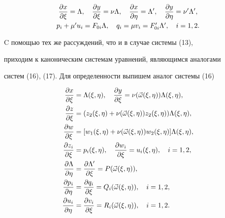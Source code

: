 \begin{equation} 


\begin{array}{c} 


\displaystyle\myfrac{x}{\xi}=\Lambda,\quad 


\myfrac{y}{\xi}=\nu\Lambda,\quad 


\myfrac{x}{\eta}=\Lambda',\quad \myfrac{y}{\eta} 


=\nu'\Lambda', \\[3mm] 


% 


p_i+\mu' u_i=F_{0i}\Lambda,\quad 


q_i=\mu v_i=F'_{0i}\Lambda',\quad i=1,2. 


\end{array} 


\end{equation} 


C помощью тех же рассуждений, что и в случае системы (13), 


приходим к каноническим системам уравнений, являющимся аналогами 


систем (16), (17). Для определенности выпишем аналог системы (16)


\begin{align} 


\myfrac{x}{\xi}&=\Lambda(\xi,\eta),\quad 


\myfrac{y}{\xi}=\nu(\Vec\omega(\xi,\eta))\Lambda(\xi,\eta),\notag\\ 


% 


\myfrac{z}{\xi}&=(z_2(\xi,\eta)+\nu(\Vec\omega(\xi,\eta))z_2 


(\xi,\eta))\Lambda(\xi,\eta),\notag \\ 


% 


\myfrac{w}{\xi}&=[w_1(\xi,\eta)+\nu(\Vec\omega(\xi,\eta)) 


w_2(\xi,\eta)]\Lambda(\xi,\eta),\notag \\ 


% 


\myfrac{z_i}{\xi}&=p_i(\xi,\eta),\quad \myfrac{w_i}{\xi}= 


u_i(\xi,\eta),\quad i=1,2,\\ 


% 


\myfrac{\Lambda}{\eta}&=\myfrac{\Lambda'}{\xi}= 


P(\Vec\omega(\xi,\eta)),\notag \\ 


% 


\myfrac{p_i}{\eta}&=\myfrac{q_i}{\xi}=Q_i 


(\Vec\omega(\xi,\eta)),\quad i=1,2,\notag \\ 


% 


\myfrac{u_i}{\eta}&=\myfrac{v_i}{\xi}=R_i 


(\Vec\omega(\xi,\eta)),\quad i=1,2.\notag 


\end{align} 


